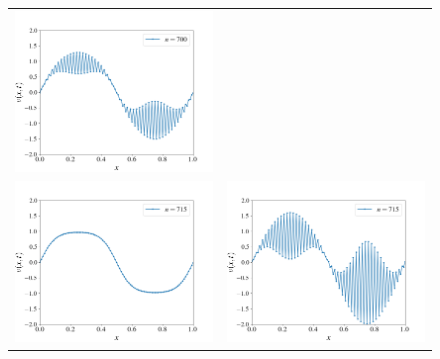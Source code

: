 \documentclass[12pt, reqno]{report}
\theoremstyle{definition}
\theoremstyle{remark}
\begin{document}
\begin{figure}[H]
\begin{tabular}{cc}
        \includegraphics[width=\acfdwidth]{media_paper/unstable_AC_FD_700} \\
        \includegraphics[width=\acfdwidth]{media_paper/stable_AC_FD_715} & 
        \includegraphics[width=\acfdwidth]{media_paper/unstable_AC_FD_715}

\end{tabular}
\end{figure}
\end{document}
